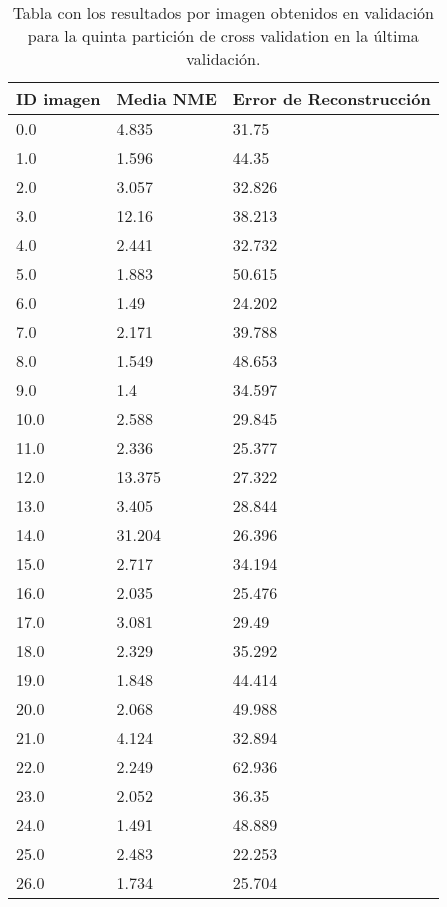 \begin{table}[!ht]
    \centering
    \caption{Tabla con los resultados por imagen obtenidos en validación para la quinta partición de cross validation en la última validación.}
    \begin{tabular}{|l|l|l|}
    \hline
        ID imagen & Media NME & Error de Reconstrucción \\ \hline
        0.0 & 4.835 & 31.75 \\ \hline
        1.0 & 1.596 & 44.35 \\ \hline
        2.0 & 3.057 & 32.826 \\ \hline
        3.0 & 12.16 & 38.213 \\ \hline
        4.0 & 2.441 & 32.732 \\ \hline
        5.0 & 1.883 & 50.615 \\ \hline
        6.0 & 1.49 & 24.202 \\ \hline
        7.0 & 2.171 & 39.788 \\ \hline
        8.0 & 1.549 & 48.653 \\ \hline
        9.0 & 1.4 & 34.597 \\ \hline
        10.0 & 2.588 & 29.845 \\ \hline
        11.0 & 2.336 & 25.377 \\ \hline
        12.0 & 13.375 & 27.322 \\ \hline
        13.0 & 3.405 & 28.844 \\ \hline
        14.0 & 31.204 & 26.396 \\ \hline
        15.0 & 2.717 & 34.194 \\ \hline
        16.0 & 2.035 & 25.476 \\ \hline
        17.0 & 3.081 & 29.49 \\ \hline
        18.0 & 2.329 & 35.292 \\ \hline
        19.0 & 1.848 & 44.414 \\ \hline
        20.0 & 2.068 & 49.988 \\ \hline
        21.0 & 4.124 & 32.894 \\ \hline
        22.0 & 2.249 & 62.936 \\ \hline
        23.0 & 2.052 & 36.35 \\ \hline
        24.0 & 1.491 & 48.889 \\ \hline
        25.0 & 2.483 & 22.253 \\ \hline
        26.0 & 1.734 & 25.704 \\ \hline
    \end{tabular}
    \label{table:Decoder_images_5}
\end{table}

\endinput
